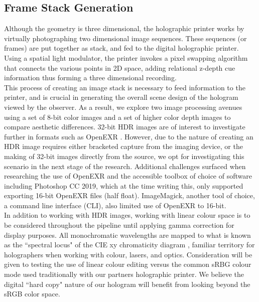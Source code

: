 \subsection{Frame Stack Generation}
Although the geometry is three dimensional, the holographic printer works by virtually photographing two dimensional image sequences.  These sequences (or frames) are put together as stack, and fed to the  digital holographic printer.  Using a spatial light modulator, the printer invokes a pixel swapping algorithm that connects the various points in 2D space, adding relational z-depth cue information thus forming a three dimensional recording.\\

This process of creating an image stack is necessary to feed information to the printer, and is crucial in generating the overall scene design of the hologram viewed by the observer. As a result, we explore two image processing avenues using a set of 8-bit color images and a set of higher color depth images to compare aesthetic differences. 32-bit HDR images are of interest to investigate further in formats such as OpenEXR \cite{kainz2009technical}. However, due to the nature of creating an HDR image requires either bracketed capture from the imaging device, or the making of 32-bit images directly from the source, we opt for investigating this scenario in the next stage of the research. Additional challenges surfaced when researching the use of OpenEXR and the accessible toolbox of choice of software including Photoshop CC 2019, which at the time writing this, only supported exporting 16-bit OpenEXR files (half float).  ImageMagick, another tool of choice, a command line interface (CLI), also limited use of OpenEXR to 16-bit.\\

In addition to working with HDR images, working with linear colour space is to be considered throughout the pipeline until applying gamma correction for display purposes.  All monochromatic wavelengths are mapped to what is known as the ``spectral locus" of the CIE xy chromaticity diagram \cite{mansencal_thomas_2018_2647615} \cite{reinhard2010high}, familiar territory for holographers when working with colour, lasers, and optics.  Consideration will be given to testing the use of linear colour editing versus the common sRBG colour mode used traditionally with our partners holographic printer.  We believe the digital ``hard copy" nature of our hologram will benefit from looking beyond the sRGB color space.

